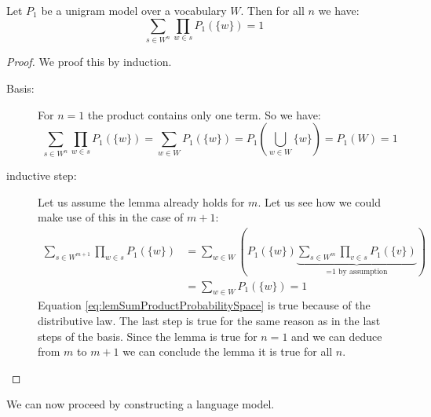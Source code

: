 \documentclass[•]{book}
\begin{document}
\begin{lemma}\label{lem:sumProductProbabilitySpace}
Let $P_1$ be a unigram model over a vocabulary $W$. Then for all $n$ we have:
\[
\sum_{s\in W^n}\prod_{w\in s}P_1(\{w\}) =1
\]
\end{lemma}
\begin{proof}
We proof this by induction.
\begin{description}
\item[Basis:] For $n=1$ the product contains only one term. So we have:
\[
\sum_{s\in W^n}\prod_{w\in s}P_1(\{w\}) = \sum_{w\in W}P_1(\{w\}) = P_1(\bigcup_{w\in W}\{w\}) = P_1(W) =  1
\]

\item[inductive step:] Let us assume the lemma already holds for $m$. Let us see how we could make use of this in the case of $m+1$:
\begin{align}
 \sum_{s\in W^{m+1}}\prod_{w\in s}P_1(\{w\}) & = \sum_{w\in W}\left(P_1(\{w\})\underbrace{ \sum_{s\in W^m}\prod_{v\in s}P_1(\{v\}) } _{\text{=1 by assumption}}\right) \label{eq:lemSumProductProbabilitySpace}  \\
 &= \sum_{w\in W}P_1(\{w\}) = 1
\end{align}
Equation \ref{eq:lemSumProductProbabilitySpace} is true because of the distributive law.
The last step is true for the same reason as in the last steps of the basis.
Since the lemma is true for $n=1$ and we can deduce from $m$ to $m+1$ we can conclude the lemma it is true for all $n$.
\end{description}
\end{proof}


We can now proceed by constructing a language model.
\end{document}
